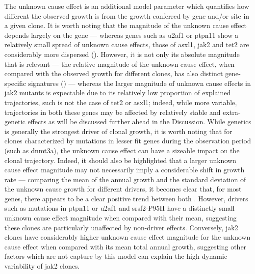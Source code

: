 The unknown cause effect is an additional model parameter which quantifies how different the observed growth is from the growth conferred by gene and/or site in a given clone. It is worth noting that the magnitude of the unknown cause effect depends largely on the gene --- whereas genes such as \ac{u2af1} or \ac{ptpn11} show a relatively small spread of unknown cause effects, those of \ac{asxl1}, \ac{jak2} and \ac{tet2} are considerably more dispersed (). However, it is not only its absolute magnitude that is relevant --- the relative magnitude of the unknown cause effect, when compared with the observed growth for different clones, has also distinct gene-specific signatures () --- whereas the larger magnitude of unknown cause effects in \ac{jak2} mutants is expectable due to its relatively low proportion of explained trajectories, such is not the case of \ac{tet2} or \ac{asxl1}; indeed, while more variable, trajectories in both these genes may be affected by relatively stable and extra-genetic effects as will be discussed further ahead in the Discussion. While genetics is generally the strongest driver of clonal growth, it is worth noting that for clones characterized by mutations in lesser fit genes during the observation period (such as \ac{dnmt3a}), the unknown cause effect can have a sizeable impact on the clonal trajectory. Indeed, it should also be highlighted that a larger unknown cause effect magnitude may not necessarily imply a considerable shift in growth rate --- comparing the mean of the annual growth and the standard deviation of the unknown cause growth for different drivers, it becomes clear that, for most genes, there appears to be a clear positive trend between both . However, drivers such as mutations in \ac{ptpn11} or \ac{u2af1} and \ac{srsf2}-P95H have a distinctly small unknown cause effect magnitude when compared with their mean, suggesting these clones are particularly unaffected by non-driver effects. Conversely, \ac{jak2} clones have considerably higher unknown cause effect magnitude for the unknown cause effect when compared with its mean total annual growth, suggesting other factors which are not capture by this model can explain the high dynamic variability of \ac{jak2} clones.

\begin{figure}[!ht]
	\label{fig:unknown-by-gene}
\end{figure}

